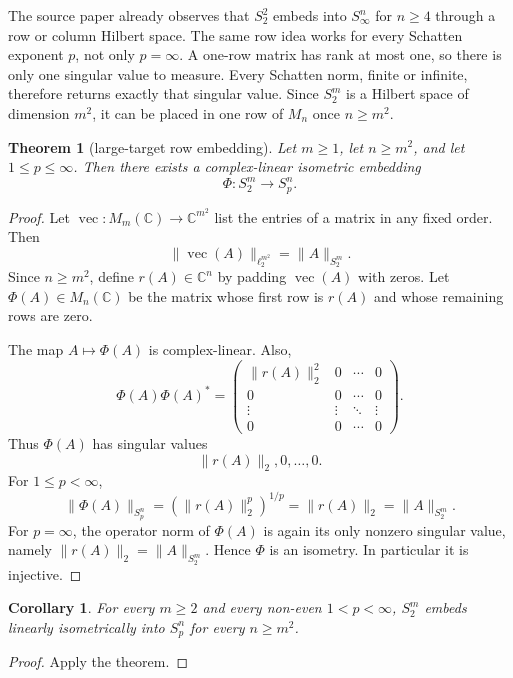 \documentclass[11pt]{article}
\newtheorem{theorem}{Theorem}
\newtheorem{corollary}{Corollary}
\DeclareMathOperator{\vecop}{vec}
\begin{document}
The source paper already observes that \(S_2^2\) embeds into \(S_\infty^n\) for \(n\ge 4\) through a row or column Hilbert space. The same row idea works for every Schatten exponent \(p\), not only \(p=\infty\). A one-row matrix has rank at most one, so there is only one singular value to measure. Every Schatten norm, finite or infinite, therefore returns exactly that singular value. Since \(S_2^m\) is a Hilbert space of dimension \(m^2\), it can be placed in one row of \(M_n\) once \(n\ge m^2\).

\begin{theorem}[large-target row embedding]
Let \(m\ge 1\), let \(n\ge m^2\), and let \(1\le p\le\infty\). Then there exists a complex-linear isometric embedding
\[
\Phi:S_2^m\longrightarrow S_p^n.
\]
\end{theorem}

\begin{proof}
Let \(\vecop:M_m(\mathbb C)\to\mathbb C^{m^2}\) list the entries of a matrix in any fixed order. Then
\[
\|\vecop(A)\|_{\ell_2^{m^2}}=\|A\|_{S_2^m}.
\]
Since \(n\ge m^2\), define \(r(A)\in\mathbb C^n\) by padding \(\vecop(A)\) with zeros. Let \(\Phi(A)\in M_n(\mathbb C)\) be the matrix whose first row is \(r(A)\) and whose remaining rows are zero.

The map \(A\mapsto\Phi(A)\) is complex-linear. Also,
\[
\Phi(A)\Phi(A)^*
=
\begin{pmatrix}
\|r(A)\|_2^2 & 0 & \cdots & 0\\
0&0&\cdots&0\\
\vdots&\vdots&\ddots&\vdots\\
0&0&\cdots&0
\end{pmatrix}.
\]
Thus \(\Phi(A)\) has singular values
\[
\|r(A)\|_2,0,\ldots,0.
\]
For \(1\le p<\infty\),
\[
\|\Phi(A)\|_{S_p^n}
=\left(\|r(A)\|_2^p\right)^{1/p}
=\|r(A)\|_2
=\|A\|_{S_2^m}.
\]
For \(p=\infty\), the operator norm of \(\Phi(A)\) is again its only nonzero singular value, namely \(\|r(A)\|_2=\|A\|_{S_2^m}\). Hence \(\Phi\) is an isometry. In particular it is injective.
\end{proof}

\begin{corollary}
For every \(m\ge 2\) and every non-even \(1<p<\infty\), \(S_2^m\) embeds linearly isometrically into \(S_p^n\) for every \(n\ge m^2\).
\end{corollary}

\begin{proof}
Apply the theorem.
\end{proof}
\end{document}
